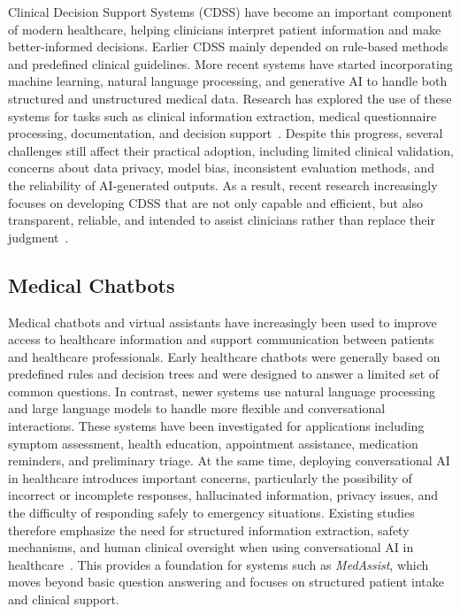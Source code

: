 \documentclass[conference]{IEEEtran}
\begin{document}
Clinical Decision Support Systems (CDSS) have become an important component of modern healthcare, helping clinicians interpret patient information and make better-informed decisions. Earlier CDSS mainly depended on rule-based methods and predefined clinical guidelines. More recent systems have started incorporating machine learning, natural language processing, and generative AI to handle both structured and unstructured medical data. Research has explored the use of these systems for tasks such as clinical information extraction, medical questionnaire processing, documentation, and decision support~\cite{hossain2023}. Despite this progress, several challenges still affect their practical adoption, including limited clinical validation, concerns about data privacy, model bias, inconsistent evaluation methods, and the reliability of AI-generated outputs. As a result, recent research increasingly focuses on developing CDSS that are not only capable and efficient, but also transparent, reliable, and intended to assist clinicians rather than replace their judgment~\cite{devere2025}.

\subsection{Medical Chatbots}

Medical chatbots and virtual assistants have increasingly been used to improve access to healthcare information and support communication between patients and healthcare professionals. Early healthcare chatbots were generally based on predefined rules and decision trees and were designed to answer a limited set of common questions. In contrast, newer systems use natural language processing and large language models to handle more flexible and conversational interactions. These systems have been investigated for applications including symptom assessment, health education, appointment assistance, medication reminders, and preliminary triage. At the same time, deploying conversational AI in healthcare introduces important concerns, particularly the possibility of incorrect or incomplete responses, hallucinated information, privacy issues, and the difficulty of responding safely to emergency situations. Existing studies therefore emphasize the need for structured information extraction, safety mechanisms, and human clinical oversight when using conversational AI in healthcare~\cite{luo2025}. This provides a foundation for systems such as \textit{MedAssist}, which moves beyond basic question answering and focuses on structured patient intake and clinical support.
\end{document}
